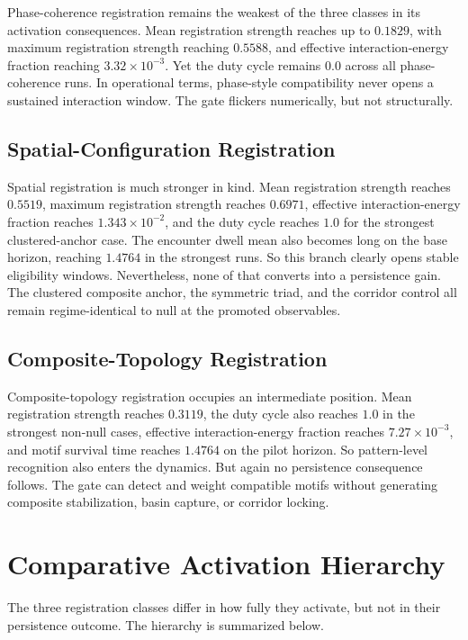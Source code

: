\documentclass[11pt]{article}
\begin{document}
Phase-coherence registration remains the weakest of the three classes in its activation consequences. Mean registration strength reaches up to $0.1829$, with maximum registration strength reaching $0.5588$, and effective interaction-energy fraction reaching $3.32\times10^{-3}$. Yet the duty cycle remains $0.0$ across all phase-coherence runs. In operational terms, phase-style compatibility never opens a sustained interaction window. The gate flickers numerically, but not structurally.

\subsection{Spatial-Configuration Registration}

Spatial registration is much stronger in kind. Mean registration strength reaches $0.5519$, maximum registration strength reaches $0.6971$, effective interaction-energy fraction reaches $1.343\times10^{-2}$, and the duty cycle reaches $1.0$ for the strongest clustered-anchor case. The encounter dwell mean also becomes long on the base horizon, reaching $1.4764$ in the strongest runs. So this branch clearly opens stable eligibility windows. Nevertheless, none of that converts into a persistence gain. The clustered composite anchor, the symmetric triad, and the corridor control all remain regime-identical to null at the promoted observables.

\subsection{Composite-Topology Registration}

Composite-topology registration occupies an intermediate position. Mean registration strength reaches $0.3119$, the duty cycle also reaches $1.0$ in the strongest non-null cases, effective interaction-energy fraction reaches $7.27\times10^{-3}$, and motif survival time reaches $1.4764$ on the pilot horizon. So pattern-level recognition also enters the dynamics. But again no persistence consequence follows. The gate can detect and weight compatible motifs without generating composite stabilization, basin capture, or corridor locking.

\section{Comparative Activation Hierarchy}

The three registration classes differ in how fully they activate, but not in their persistence outcome. The hierarchy is summarized below.
\end{document}
